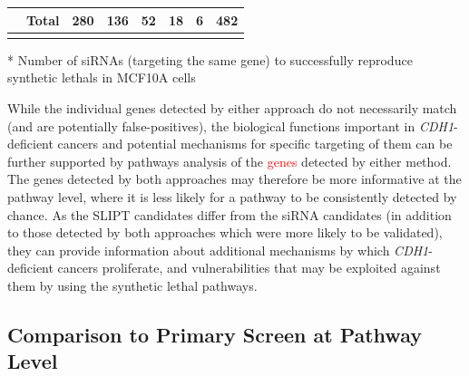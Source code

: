 \begin{table}[!ht]
\begin{center}
{\begin{threeparttable}
\begin{tabular}{>{\cellcolor{white}}rrcccccl}
\rowcolor{black!5}
\cellcolor{white}                                                           & \multicolumn{1}{r|}{\cellcolor{white} \bfseries Total}            & \multicolumn{1}{c}{280} & \multicolumn{1}{c}{136} & \multicolumn{1}{c}{52} & \multicolumn{1}{c}{18} & \multicolumn{1}{c|}{6}   & \multicolumn{1}{l|}{482}                  \\ \cline{3-8} 
\end{tabular} 
\begin{tablenotes}
\raggedright %
\item[*] Number of \glspl{siRNA} (targeting the same gene) to successfully reproduce \glspl{synthetic lethal} in MCF10A cells \citep{Telford2015}

\end{tablenotes}
\end{threeparttable}
}
\end{center}
\end{table}

While the individual genes detected by either approach do not necessarily match (and are potentially false-positives), the biological functions important in \textit{CDH1}-deficient cancers and potential mechanisms for specific targeting of them can be further supported by \glspl{pathway} analysis of the \textcolor{red}{genes} detected by either method. The genes detected by both approaches may therefore be more informative at the \gls{pathway} level, where it is less likely for a \gls{pathway} to be consistently detected by chance. As the \gls{SLIPT} candidates differ from the \gls{siRNA} candidates (in addition to those detected by both approaches which were more likely to be validated), they can provide information about additional mechanisms by which \textit{CDH1}-deficient cancers proliferate, and vulnerabilities that may be exploited against them by using the \gls{synthetic lethal} \glspl{pathway}.

\FloatBarrier

\subsection{Comparison to Primary Screen at Pathway Level}  \label{chapt3:compare_pathway}

